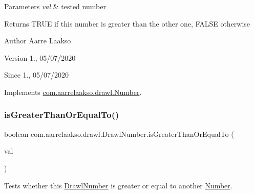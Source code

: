 \begin{DoxyParams}{Parameters}
{\em val} & tested number \\
\hline
\end{DoxyParams}
\begin{DoxyReturn}{Returns}
{\ttfamily T\+R\+UE} if this number is greater than the other one, {\ttfamily F\+A\+L\+SE} otherwise 
\end{DoxyReturn}
\begin{DoxyAuthor}{Author}
Aarre Laakso 
\end{DoxyAuthor}
\begin{DoxyVersion}{Version}
1., 05/07/2020 
\end{DoxyVersion}
\begin{DoxySince}{Since}
1., 05/07/2020 
\end{DoxySince}


Implements \hyperlink{interfacecom_1_1aarrelaakso_1_1drawl_1_1_number_ab3c02c742e083e6850ee6d2fe88e985b}{com.\+aarrelaakso.\+drawl.\+Number}.

\mbox{\label{classcom_1_1aarrelaakso_1_1drawl_1_1_drawl_number_a4818a61a5d26f43b0d5e11cb9f22551f}} 
\subsubsection{\texorpdfstring{is\+Greater\+Than\+Or\+Equal\+To()}{isGreaterThanOrEqualTo()}\hspace{0.1cm}{\footnotesize\ttfamily [1/2]}}
{\footnotesize\ttfamily boolean com.\+aarrelaakso.\+drawl.\+Drawl\+Number.\+is\+Greater\+Than\+Or\+Equal\+To (\begin{DoxyParamCaption}\item[{@Not\+Null final \hyperlink{interfacecom_1_1aarrelaakso_1_1drawl_1_1_number}{Number}}]{val }\end{DoxyParamCaption})}



Tests whether this \hyperlink{classcom_1_1aarrelaakso_1_1drawl_1_1_drawl_number}{Drawl\+Number} is greater or equal to another \hyperlink{interfacecom_1_1aarrelaakso_1_1drawl_1_1_number}{Number}. 


